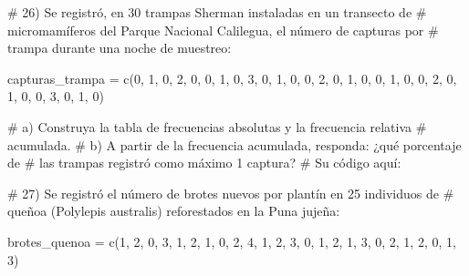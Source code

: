 \documentclass[
  spanish,
  letterpaper,
  DIV=11,
  numbers=noendperiod]{scrreprt}
\newenvironment{Shaded}{\begin{snugshade}}{\end{snugshade}}
\newcommand{\CommentTok}[1]{\textcolor[rgb]{0.37,0.37,0.37}{#1}}
\newcommand{\DecValTok}[1]{\textcolor[rgb]{0.68,0.00,0.00}{#1}}
\newcommand{\FunctionTok}[1]{\textcolor[rgb]{0.28,0.35,0.67}{#1}}
\newcommand{\NormalTok}[1]{\textcolor[rgb]{0.00,0.23,0.31}{#1}}
\newcommand{\OtherTok}[1]{\textcolor[rgb]{0.00,0.23,0.31}{#1}}
\begin{document}
\begin{Shaded}
\begin{Highlighting}[]
\CommentTok{\# 26) Se registró, en 30 trampas Sherman instaladas en un transecto de}
\CommentTok{\#     micromamíferos del Parque Nacional Calilegua, el número de capturas por}
\CommentTok{\#     trampa durante una noche de muestreo:}

\NormalTok{capturas\_trampa }\OtherTok{=} \FunctionTok{c}\NormalTok{(}\DecValTok{0}\NormalTok{, }\DecValTok{1}\NormalTok{, }\DecValTok{0}\NormalTok{, }\DecValTok{2}\NormalTok{, }\DecValTok{0}\NormalTok{, }\DecValTok{0}\NormalTok{, }\DecValTok{1}\NormalTok{, }\DecValTok{0}\NormalTok{, }\DecValTok{3}\NormalTok{, }\DecValTok{0}\NormalTok{,}
                     \DecValTok{1}\NormalTok{, }\DecValTok{0}\NormalTok{, }\DecValTok{0}\NormalTok{, }\DecValTok{2}\NormalTok{, }\DecValTok{0}\NormalTok{, }\DecValTok{1}\NormalTok{, }\DecValTok{0}\NormalTok{, }\DecValTok{0}\NormalTok{, }\DecValTok{1}\NormalTok{, }\DecValTok{0}\NormalTok{,}
                     \DecValTok{0}\NormalTok{, }\DecValTok{2}\NormalTok{, }\DecValTok{0}\NormalTok{, }\DecValTok{1}\NormalTok{, }\DecValTok{0}\NormalTok{, }\DecValTok{0}\NormalTok{, }\DecValTok{3}\NormalTok{, }\DecValTok{0}\NormalTok{, }\DecValTok{1}\NormalTok{, }\DecValTok{0}\NormalTok{)}

\CommentTok{\#     a) Construya la tabla de frecuencias absolutas y la frecuencia relativa}
\CommentTok{\#        acumulada.}
\CommentTok{\#     b) A partir de la frecuencia acumulada, responda: ¿qué porcentaje de}
\CommentTok{\#        las trampas registró como máximo 1 captura?}
\CommentTok{\# Su código aquí:}


\CommentTok{\# 27) Se registró el número de brotes nuevos por plantín en 25 individuos de}
\CommentTok{\#     queñoa (Polylepis australis) reforestados en la Puna jujeña:}

\NormalTok{brotes\_quenoa }\OtherTok{=} \FunctionTok{c}\NormalTok{(}\DecValTok{1}\NormalTok{, }\DecValTok{2}\NormalTok{, }\DecValTok{0}\NormalTok{, }\DecValTok{3}\NormalTok{, }\DecValTok{1}\NormalTok{, }\DecValTok{2}\NormalTok{, }\DecValTok{1}\NormalTok{, }\DecValTok{0}\NormalTok{, }\DecValTok{2}\NormalTok{, }\DecValTok{4}\NormalTok{,}
                   \DecValTok{1}\NormalTok{, }\DecValTok{2}\NormalTok{, }\DecValTok{3}\NormalTok{, }\DecValTok{0}\NormalTok{, }\DecValTok{1}\NormalTok{, }\DecValTok{2}\NormalTok{, }\DecValTok{1}\NormalTok{, }\DecValTok{3}\NormalTok{, }\DecValTok{0}\NormalTok{, }\DecValTok{2}\NormalTok{,}
                   \DecValTok{1}\NormalTok{, }\DecValTok{2}\NormalTok{, }\DecValTok{0}\NormalTok{, }\DecValTok{1}\NormalTok{, }\DecValTok{3}\NormalTok{)}


\end{Highlighting}
\end{Shaded}
\end{document}
